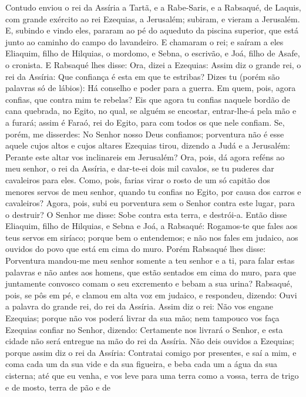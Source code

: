 Contudo enviou o rei da Assíria a Tartã, e a Rabe-Saris, e a
Rabsaqué, de Laquis, com grande exército ao rei Ezequias, a
Jerusalém; subiram, e vieram a Jerusalém. E, subindo e vindo eles,
pararam ao pé do aqueduto da piscina superior, que está junto ao
caminho do campo do lavandeiro. E chamaram o rei; e saíram a
eles Eliaquim, filho de Hilquias, o mordomo, e Sebna, o escrivão, e
Joá, filho de Asafe, o cronista. E Rabsaqué lhes disse: Ora,
dizei a Ezequias: Assim diz o grande rei, o rei da Assíria: Que
confiança é esta em que te estribas? Dizes tu (porém são
palavras só de lábios): Há conselho e poder para a guerra. Em quem,
pois, agora confias, que contra mim te rebelas? Eis que agora
tu confias naquele bordão de cana quebrada, no Egito, no qual, se
alguém se encostar, entrar-lhe-á pela mão e a furará; assim é Faraó,
rei do Egito, para com todos os que nele confiam. Se, porém,
me disserdes: No Senhor nosso Deus confiamos; porventura não é esse
aquele cujos altos e cujos altares Ezequias tirou, dizendo a Judá e
a Jerusalém: Perante este altar vos inclinareis em Jerusalém?
Ora, pois, dá agora reféns ao meu senhor, o rei da Assíria, e
dar-te-ei dois mil cavalos, se tu puderes dar cavaleiros para eles.
Como, pois, farias virar o rosto de um só capitão dos menores
servos de meu senhor, quando tu confias no Egito, por causa dos
carros e cavaleiros? Agora, pois, subi eu porventura sem o
Senhor contra este lugar, para o destruir? O Senhor me disse: Sobe
contra esta terra, e destrói-a. Então disse Eliaquim, filho
de Hilquias, e Sebna e Joá, a Rabsaqué: Rogamos-te que fales aos
teus servos em siríaco; porque bem o entendemos; e não nos fales em
judaico, aos ouvidos do povo que está em cima do muro. Porém
Rabsaqué lhes disse: Porventura mandou-me meu senhor somente a teu
senhor e a ti, para falar estas palavras e não antes aos homens, que
estão sentados em cima do muro, para que juntamente convosco comam o
seu excremento e bebam a sua urina? Rabsaqué, pois, se pôs em
pé, e clamou em alta voz em judaico, e respondeu, dizendo: Ouvi a
palavra do grande rei, do rei da Assíria. Assim diz o rei:
Não vos engane Ezequias; porque não vos poderá livrar da sua mão;
nem tampouco vos faça Ezequias confiar no Senhor, dizendo:
Certamente nos livrará o Senhor, e esta cidade não será entregue na
mão do rei da Assíria. Não deis ouvidos a Ezequias; porque
assim diz o rei da Assíria: Contratai comigo por presentes, e saí a
mim, e coma cada um da sua vide e da sua figueira, e beba cada um a
água da sua cisterna; até que eu venha, e vos leve para uma
terra como a vossa, terra de trigo e de mosto, terra de pão e de
